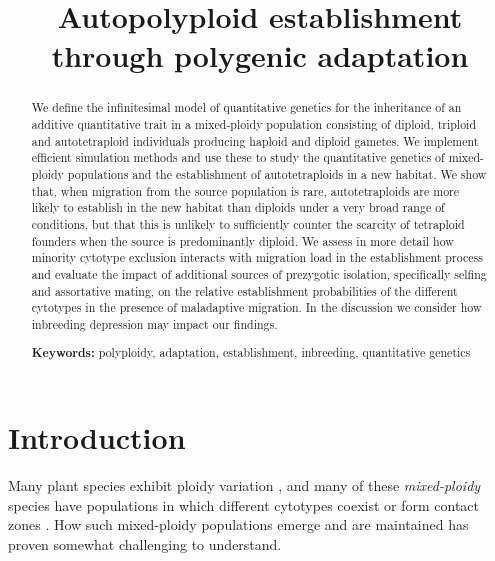 \documentclass[12pt,a4paper]{article}
\begin{document}
    \title{Autopolyploid establishment through polygenic adaptation}
    \author{}
    \date{\vspace{-5ex}}
    \maketitle
    \begin{abstract}
    We define the infinitesimal model of quantitative genetics for the inheritance
        of an additive quantitative trait in a mixed-ploidy population consisting
        of diploid, triploid and autotetraploid individuals producing haploid and
        diploid gametes.
        We implement efficient simulation methods and use these to study the
        quantitative genetics of mixed-ploidy populations and the establishment of
        autotetraploids in a new habitat.
        We show that, when migration from the source population is rare,
        autotetraploids are more likely to establish in the new habitat 
        than diploids under a very broad range of conditions, but that this
        is unlikely to sufficiently counter the scarcity of tetraploid founders
        when the source is predominantly diploid.
        We assess in more detail how minority cytotype exclusion interacts with
        migration load in the establishment process and evaluate the impact of
        additional sources of prezygotic isolation, specifically selfing and
        assortative mating, on the relative establishment probabilities of the
        different cytotypes in the presence of maladaptive migration.
        In the discussion we consider how inbreeding depression may impact our
        findings.

        \textbf{Keywords:} polyploidy, adaptation, establishment, inbreeding,
        quantitative genetics 
    \end{abstract}

    \section*{Introduction}

    Many plant species exhibit ploidy variation
    \citep{levin2002,soltis2007,rice2015}, and many of these \textit{mixed-ploidy}
    species have populations in which different cytotypes coexist or form contact
    zones \citep{kolar2017}.
    How such mixed-ploidy populations emerge and are maintained has proven somewhat
    challenging to understand.
\end{document}

